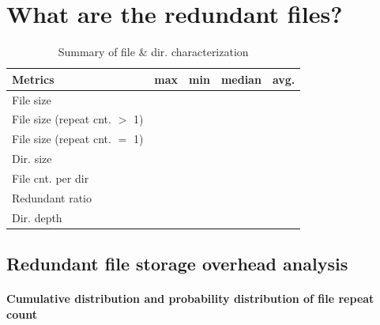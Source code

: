 
\section{What are the redundant files?}
\label{sec:redundant_files}

\begin{table} 
	\centering 
	\scriptsize  
	\caption{Summary of file \& dir. characterization} \label{tbl:redundant_ratio} 
	\begin{tabular}{|l|l|l|l|l|}%
		\hline 
		Metrics & max & min & median & avg.\\
		\hline
		File size &   &   &   &  \\
		\hline
		File size (repeat cnt. $>$ 1) &   &   &    &  \\
		\hline
		File size (repeat cnt. $=$ 1) &   &   &    &  \\
		\hline
		\hline
		Dir. size &  &  & & \\
		\hline
		File cnt. per dir & &  &  & \\
		\hline
		Redundant ratio & &  &  & \\
		\hline
		Dir. depth  &  &  & & \\
		\hline
	\end{tabular} 
\end{table} 

\subsection{Redundant file storage overhead analysis}

\paragraph{Cumulative distribution and probability distribution of file repeat count}

